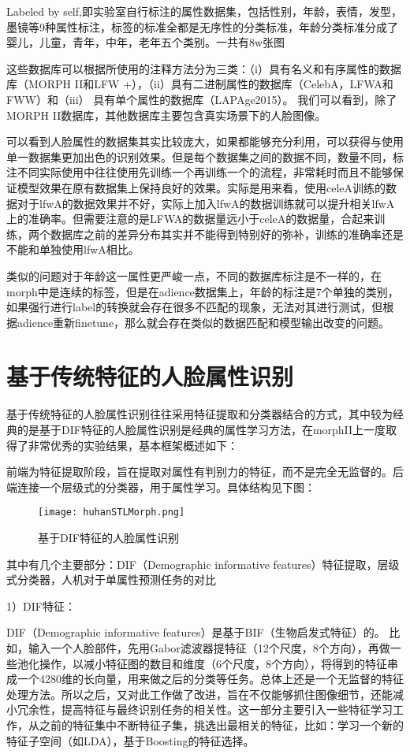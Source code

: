 Labeled by self,即实验室自行标注的属性数据集，包括性别，年龄，表情，发型，墨镜等9种属性标注，标签的标准全都是无序性的分类标准，年龄分类标准分成了婴儿，儿童，青年，中年，老年五个类别。一共有8w张图


这些数据库可以根据所使用的注释方法分为三类：（i）具有名义和有序属性的数据库（MORPH II和LFW +），（ii）具有二进制属性的数据库（CelebA，LFWA和FWW）和（iii） 具有单个属性的数据库（LAPAge2015）。 我们可以看到，除了MORPH II数据库，其他数据库主要包含真实场景下的人脸图像。  

可以看到人脸属性的数据集其实比较庞大，如果都能够充分利用，可以获得与使用单一数据集更加出色的识别效果。但是每个数据集之间的数据不同，数量不同，标注不同实际使用中往往使用先训练一个再训练一个的流程，非常耗时而且不能够保证模型效果在原有数据集上保持良好的效果。实际是用来看，使用celeA训练的数据对于lfwA的数据效果并不好，实际上加入lfwA的数据训练就可以提升相关lfwA上的准确率。但需要注意的是LFWA的数据量远小于celeA的数据量，合起来训练，两个数据库之前的差异分布其实并不能得到特别好的弥补，训练的准确率还是不能和单独使用lfwA相比。

类似的问题对于年龄这一属性更严峻一点，不同的数据库标注是不一样的，在morph中是连续的标签，但是在adience数据集上，年龄的标注是7个单独的类别，如果强行进行label的转换就会存在很多不匹配的现象，无法对其进行测试，但根据adience重新finetune，那么就会存在类似的数据匹配和模型输出改变的问题。

\section{基于传统特征的人脸属性识别}
基于传统特征的人脸属性识别往往采用特征提取和分类器结合的方式，其中较为经典的是基于DIF特征的人脸属性识别是经典的属性学习方法，在morphII上一度取得了非常优秀的实验结果，基本框架概述如下：

前端为特征提取阶段，旨在提取对属性有判别力的特征，而不是完全无监督的。后端连接一个层级式的分类器，用于属性学习。具体结构见下图：
\begin{figure}[!ht]
 \centering
	\texttt{[image: huhanSTLMorph.png]}
	\caption{基于DIF特征的人脸属性识别}
\end{figure}

其中有几个主要部分：DIF（Demographic informative features）特征提取，层级式分类器，人机对于单属性预测任务的对比

1）DIF特征：

DIF（Demographic informative features）是基于BIF（生物启发式特征）的。
比如，输入一个人脸部件，先用Gabor滤波器提特征（12个尺度，8个方向），再做一些池化操作，以减小特征图的数目和维度（6个尺度，8个方向），将得到的特征串成一个4280维的长向量，用来做之后的分类等任务。总体上还是一个无监督的特征处理方法。所以之后，又对此工作做了改进，旨在不仅能够抓住图像细节，还能减小冗余性，提高特征与最终识别任务的相关性。这一部分主要引入一些特征学习工作，从之前的特征集中不断特征子集，挑选出最相关的特征，比如：学习一个新的特征子空间（如LDA），基于Boosting的特征选择。

